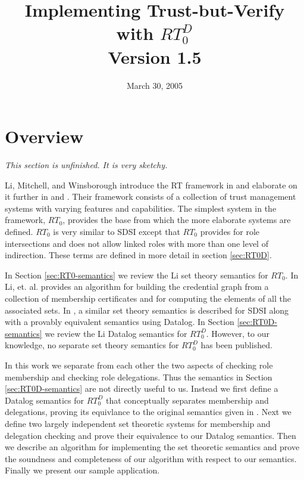 \documentclass{article}
\begin{document}
\title{Implementing Trust-but-Verify with $RT_0^D$\\
       Version 1.5}
\date{March 30, 2005}
\maketitle

\section{Overview}
\label{sec:overview}

\textit{This section is unfinished. It is very sketchy.}


Li, Mitchell, and Winsborough introduce the RT framework in \cite{Li:2002-05} and elaborate on
it further in \cite{Li:2003-02} and \cite{Li:2003-04}. Their framework consists of a collection
of trust management systems with varying features and capabilities. The simplest system in the
framework, $RT_0$, provides the base from which the more elaborate systems are defined. $RT_0$
is very similar to SDSI except that $RT_0$ provides for role intersections and does not allow
linked roles with more than one level of indirection. These terms are defined in more detail in
section \ref{sec:RT0D}.

In Section \ref{sec:RT0-semantics} we review the Li set theory semantics for $RT_0$. In
\cite{Li:2003-02} Li, et. al. provides an algorithm for building the credential graph from a
collection of membership certificates and for computing the elements of all the associated sets.
In \cite{Li:2005-xx}, a similar set theory semantics is described for SDSI along with a provably
equivalent semantics using Datalog. In Section \ref{sec:RT0D-semantics} we review the Li Datalog
semantics for $RT_0^D$. However, to our knowledge, no separate set theory semantics for $RT_0^D$
has been published.

In this work we separate from each other the two aspects of checking role membership and
checking role delegations. Thus the semantics in Section \ref{sec:RT0D-semantics} are not
directly useful to us. Instead we first define a Datalog semantics for $RT_0^D$ that
conceptually separates membership and delegations, proving its equivlance to the original
semantics given in \cite{Li:2002-05}. Next we define two largely independent set theoretic
systems for membership and delegation checking and prove their equivalence to our Datalog
semantics. Then we describe an algorithm for implementing the set theoretic semantics and prove
the soundness and completeness of our algorithm with respect to our semantics. Finally we
present our sample application.
\end{document}
